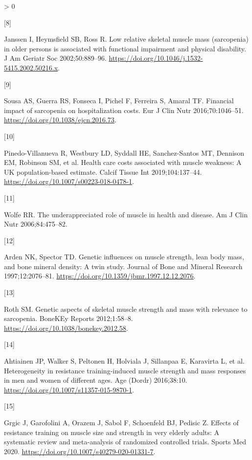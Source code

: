 \documentclass[twoside,10pt]{gihclass} %
\newlength{\cslhangindent}
\newlength{\csllabelwidth}
\newenvironment{CSLReferences}[3] %
 {%
  \setlength{\parindent}{0pt}
  \ifodd #1 \everypar{\setlength{\hangindent}{\cslhangindent}}\ignorespaces\fi
  \ifnum #2 > 0
  \setlength{\parskip}{#2\baselineskip}
  \fi
 }%
 {}
\newcommand{\CSLLeftMargin}[1]{\parbox[t]{\maxof{\widthof{#1}}{\csllabelwidth}}{#1}}
\newcommand{\CSLRightInline}[1]{\parbox[t]{\linewidth}{#1}}
\begin{document}
\begin{CSLReferences}{0}{0}
\leavevmode\hypertarget{ref-RN2517}{}%
\CSLLeftMargin{{[}8{]} }
\CSLRightInline{Janssen I, Heymsfield SB, Ross R. Low relative skeletal muscle mass (sarcopenia) in older persons is associated with functional impairment and physical disability. J Am Geriatr Soc 2002;50:889--96. \url{https://doi.org/10.1046/j.1532-5415.2002.50216.x}.}

\leavevmode\hypertarget{ref-RN2532}{}%
\CSLLeftMargin{{[}9{]} }
\CSLRightInline{Sousa AS, Guerra RS, Fonseca I, Pichel F, Ferreira S, Amaral TF. Financial impact of sarcopenia on hospitalization costs. Eur J Clin Nutr 2016;70:1046--51. \url{https://doi.org/10.1038/ejcn.2016.73}.}

\leavevmode\hypertarget{ref-RN2184}{}%
\CSLLeftMargin{{[}10{]} }
\CSLRightInline{Pinedo-Villanueva R, Westbury LD, Syddall HE, Sanchez-Santos MT, Dennison EM, Robinson SM, et al. Health care costs associated with muscle weakness: A UK population-based estimate. Calcif Tissue Int 2019;104:137--44. \url{https://doi.org/10.1007/s00223-018-0478-1}.}

\leavevmode\hypertarget{ref-RN763}{}%
\CSLLeftMargin{{[}11{]} }
\CSLRightInline{Wolfe RR. The underappreciated role of muscle in health and disease. Am J Clin Nutr 2006;84:475--82.}

\leavevmode\hypertarget{ref-RN2526}{}%
\CSLLeftMargin{{[}12{]} }
\CSLRightInline{Arden NK, Spector TD. Genetic influences on muscle strength, lean body mass, and bone mineral density: A twin study. Journal of Bone and Mineral Research 1997;12:2076--81. \url{https://doi.org/10.1359/jbmr.1997.12.12.2076}.}

\leavevmode\hypertarget{ref-RN2527}{}%
\CSLLeftMargin{{[}13{]} }
\CSLRightInline{Roth SM. Genetic aspects of skeletal muscle strength and mass with relevance to sarcopenia. BoneKEy Reports 2012;1:58--8. \url{https://doi.org/10.1038/bonekey.2012.58}.}

\leavevmode\hypertarget{ref-RN1741}{}%
\CSLLeftMargin{{[}14{]} }
\CSLRightInline{Ahtiainen JP, Walker S, Peltonen H, Holviala J, Sillanpaa E, Karavirta L, et al. Heterogeneity in resistance training-induced muscle strength and mass responses in men and women of different ages. Age (Dordr) 2016;38:10. \url{https://doi.org/10.1007/s11357-015-9870-1}.}

\leavevmode\hypertarget{ref-RN2534}{}%
\CSLLeftMargin{{[}15{]} }
\CSLRightInline{Grgic J, Garofolini A, Orazem J, Sabol F, Schoenfeld BJ, Pedisic Z. Effects of resistance training on muscle size and strength in very elderly adults: A systematic review and meta-analysis of randomized controlled trials. Sports Med 2020. \url{https://doi.org/10.1007/s40279-020-01331-7}.}


\end{CSLReferences}
\end{document}
